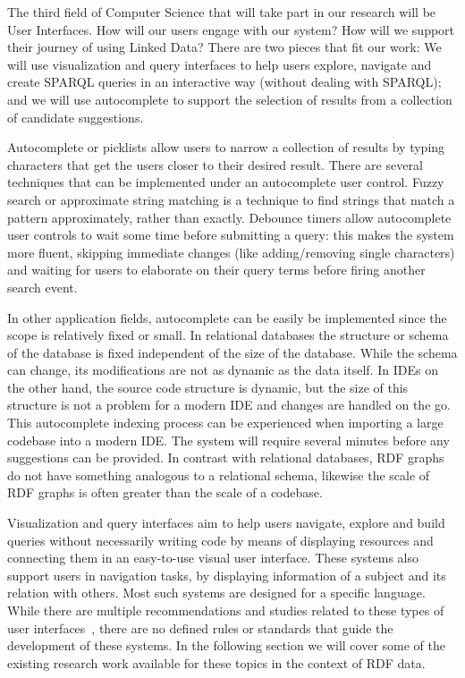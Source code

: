 The third field of Computer Science that will take part in our research will be User Interfaces. How will our users engage with our system? How will we support their journey of using Linked Data? There are two pieces that fit our work: We will use visualization and query interfaces to help users explore, navigate and create SPARQL queries in an interactive way (without dealing with SPARQL); and we will use autocomplete to support the selection of results from a collection of candidate suggestions. 

Autocomplete or picklists allow users to narrow a collection of results by typing characters that get the users closer to their desired result. There are several techniques that can be implemented under an autocomplete user control. Fuzzy search or approximate string matching is a technique to find strings that match a pattern approximately, rather than exactly. Debounce timers allow autocomplete user controls to wait some time before submitting a query: this makes the system more fluent, skipping immediate changes (like adding/removing single characters) and waiting for users to elaborate on their query terms before firing another search event.

In other application fields, autocomplete can be easily be implemented since the scope is relatively fixed or small. In relational databases the structure or schema of the database is fixed independent of the size of the database. While the schema can change, its modifications are not as dynamic as the data itself. In IDEs on the other hand, the source code structure is dynamic, but the size of this structure is not a problem for a modern IDE and changes are handled on the go. This autocomplete indexing process can be experienced when importing a large codebase into a modern IDE. The system will require several minutes before any suggestions can be provided. In contrast with relational databases, RDF graphs do not have something analogous to a relational schema, likewise the scale of RDF graphs is often greater than the scale of a codebase.

Visualization and query interfaces aim to help users navigate, explore and build queries without necessarily writing code by means of displaying resources and connecting them in an easy-to-use visual user interface. These systems also support users in navigation tasks, by displaying information of a subject and its relation with others. Most such systems are designed for a specific language. While there are multiple recommendations and studies related to these types of user interfaces~\cite{Dadzie2011, Bikakis2016}, there are no defined rules or standards that guide the development of these systems. In the following section we will cover some of the existing research work available for these topics in the context of RDF data.

